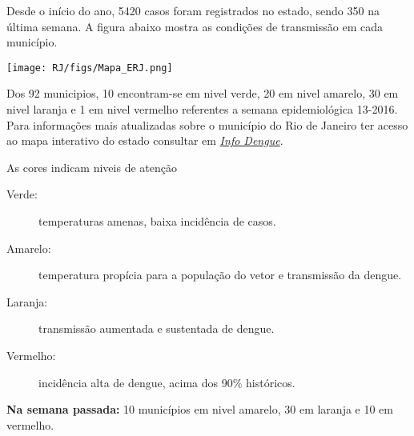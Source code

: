 \documentclass[10pt]{article} %
\begin{document}
\begin{minipage}[t]{.66\linewidth} %

\hypertarget{titulo}{} %

Desde o início do ano, 5420 casos foram registrados no estado, sendo 350 na última semana. A figura abaixo mostra as condições de transmissão em cada município.

\texttt{[image: RJ/figs/Mapa\_ERJ.png]}

Dos 92 municipios, 10 encontram-se em nivel verde, 20 em nivel amarelo, 30 em nivel laranja e 1 em nivel vermelho referentes a semana epidemiológica 13-2016. Para informações mais atualizadas
sobre o município do Rio de Janeiro ter acesso ao mapa interativo do estado consultar em \href{http://info.dengue.mat.br}{\textit{Info Dengue}}.


\vspace{1cm}
\begin{mdframed}[style=intextbox,frametitle={}] %

\hypertarget{descriptivebox}{} %
As cores indicam niveis de atenção
\begin{description}
\item[Verde:] temperaturas amenas, baixa incidência de casos.      
\item[Amarelo:] temperatura propícia para a população do vetor e transmissão da dengue.
\item[Laranja:] transmissão aumentada e sustentada de dengue. 
\item[Vermelho:] incidência alta de dengue, acima dos 90\% históricos.
\end{description}
\end{mdframed}

\textbf{Na semana passada:} 10 municípios em nivel amarelo, 30 em laranja e 10 em vermelho.    

\end{minipage} %
\end{document}
